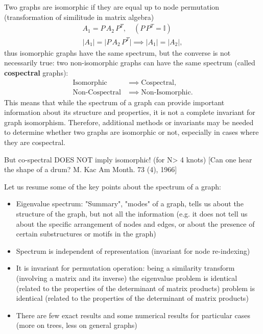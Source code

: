 Two graphs are isomorphic if they are equal up to node permutation (transformation of similitude in matrix algebra)
\[
    \begin{aligned}
        A_1 = P \, A_2 \, P^{T}, \quad \left( P\,P^T = \mathbb{I} \right) \\
        \vert A_1 \vert = \vert P\,A_2 \, P^T \vert \implies \vert A_1 \vert = \vert A_2 \vert,
    \end{aligned}
\]
thus isomorphic graphs have the same spectrum, but the converse is not necessarily true: two non-isomorphic graphs can have the same spectrum (called \textbf{cospectral} graphs):
\[
    \begin{aligned}
        \text{Isomorphic}     & \implies \text{Cospectral},     \\
        \text{Non-Cospectral} & \implies \text{Non-Isomorphic}.
    \end{aligned}
\]
This means that while the spectrum of a graph can provide important information about its structure and properties, it is not a complete invariant for graph isomorphism. Therefore, additional methods or invariants may be needed to determine whether two graphs are isomorphic or not, especially in cases where they are cospectral.

But co-spectral DOES NOT imply isomorphic! (for N> 4 knots)
[Can one hear the shape of a drum? M. Kac Am Month. 73 (4), 1966]

Let us resume some of the key points about the spectrum of a graph:
\begin{itemize}
    \item Eigenvalue spectrum: "Summary", "modes" of a graph, tells us about the structure of the graph, but not all the information (e.g. it does not tell us about the specific arrangement of nodes and edges, or about the presence of certain substructures or motifs in the graph)
    \item Spectrum is independent of representation (invariant for node re-indexing)
    \item It is invariant for permutation operation: being a similarity transform (involving a matrix and its inverse) the eigenvalue problem is identical (related to the properties of the determinant of matrix products) problem is identical (related to the properties of the determinant of matrix products)
    \item There are few exact results and some numerical results for particular cases (more on trees, less on general graphs)
\end{itemize}

